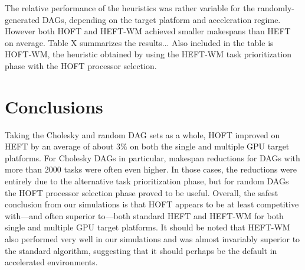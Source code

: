 \documentclass[runningheads]{llncs}
\begin{document}
The relative performance of the heuristics was rather variable for the randomly-generated DAGs, depending on the target platform and acceleration regime. However both HOFT and HEFT-WM achieved smaller makespans than HEFT on average. Table X summarizes the results... Also included in the table is HOFT-WM, the heuristic obtained by using the HEFT-WM task prioritization phase with the HOFT processor selection.  

  



\section{Conclusions}
\label{sect.conclusion}

Taking the Cholesky and random DAG sets as a whole, HOFT improved on HEFT by an average of about $3\%$ on both the single and multiple GPU target platforms. For Cholesky DAGs in particular, makespan reductions for DAGs with more than $2000$ tasks were often even higher. In those cases, the reductions were entirely due to the alternative task prioritization phase, but for random DAGs the HOFT processor selection phase proved to be useful. Overall, the safest conclusion from our simulations is that HOFT appears to be at least competitive with---and often superior to---both standard HEFT and HEFT-WM for both single and multiple GPU target platforms. It should be noted that HEFT-WM also performed very well in our simulations and was almost invariably superior to the standard algorithm, suggesting that it should perhaps be the default in accelerated environments. 
\end{document}

